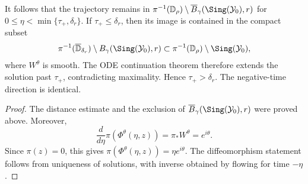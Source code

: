\documentclass[12pt]{amsart}
\begin{document}
It follows that the trajectory remains in
\(\pi^{-1}(\mathbb{D}_{\rho})\setminus \overline{B}_{\gamma}(\Sing(\mathcal{Y}_{0}),r)\)
for \(0\leq\eta<\min\{\tau_{+},\delta_{r}\}\). If \(\tau_{+}\leq\delta_{r}\), then its image is contained in
the compact subset
\[
\pi^{-1}(\overline{\mathbb{D}}_{\delta_{r}})
\setminus
B_{\gamma}(\Sing(\mathcal{Y}_{0}),r)
\subset
\pi^{-1}(\mathbb{D}_{\rho})\setminus\Sing(\mathcal{Y}_{0}),
\]
where \(W^{\theta}\) is smooth. The ODE continuation theorem therefore extends the solution past
\(\tau_{+}\), contradicting maximality. Hence \(\tau_{+}>\delta_{r}\). The negative-time direction is
identical.


\begin{proof}
The distance estimate and the exclusion of \(\overline{B}_{\gamma}(\Sing(\mathcal{Y}_{0}),r)\) were proved above.
Moreover,
\[
\frac{d}{d\eta}\pi(\Phi^{\theta}(\eta,z))
=
\pi_{*}W^{\theta}
=
e^{i\theta}.
\]
Since \(\pi(z)=0\), this gives \(\pi(\Phi^{\theta}(\eta,z))=\eta e^{i\theta}\). The diffeomorphism statement
follows from uniqueness of solutions, with inverse obtained by flowing for time \(-\eta\).
\end{proof}

\end{document}
